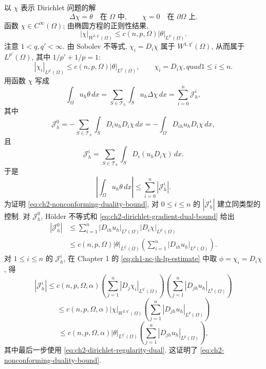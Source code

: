 \begin{Proof}
\hypertarget{chapter-02-page-145}{}
以 $\chi$ 表示 Dirichlet 问题的解
\[
\Delta\chi=\theta\quad\text{在 }\Omega\text{ 中},
\qquad\chi=0\quad\text{在 }\partial\Omega\text{ 上}.
\]
函数 $\chi\in C^\infty(\Omega)$; 由椭圆方程的正则性结果,
\begin{equation}
|\chi|_{W^{2,q'}(\Omega)}
\leq c(n,p,\Omega)|\theta|_{L^{q'}(\Omega)}.
\label{eq:ch2-dirichlet-regularity-dual}
\end{equation}
注意 $1<q,q'<\infty$. 由 Sobolev 不等式, $\chi_i=D_i\chi$ 属于 $W^{1,q'}(\Omega)$, 从而属于 $L^{p'}(\Omega)$, 其中 $1/p'+1/p=1$:
\begin{equation}
|\chi_i|_{L^{p'}(\Omega)}
\leq c(n,p,\Omega)|\theta|_{L^{q'}(\Omega)},
\qquad\chi_i=D_i\chi,quad1\leq i\leq n.
\label{eq:ch2-dirichlet-gradient-dual-bound}
\end{equation}
用函数 $\chi$ 写成
\[
\int_\Omega u_h\theta\,dx
=\sum_{S\in\mathcal T_h}\int_Su_h\Delta\chi\,dx
=\sum_{i=0}^{n}\mathcal J_h^i,
\]
其中
\[
\mathcal J_h^0=-\sum_{S\in\mathcal T_h}\int_SD_i u_hD_i\chi\,dx
=-\int_\Omega D_{ih}u_hD_i\chi\,dx,
\]
且
\[
\mathcal J_h^i=\sum_{S\in\mathcal T_h}\int_SD_i(u_hD_i\chi)\,dx.
\]
于是
\begin{equation}
\left|\int_\Omega u_h\theta\,dx\right|
\leq\sum_{i=0}^{n}|\mathcal J_h^i|.
\label{eq:ch2-nonconforming-duality-decomposition}
\end{equation}
为证明 \eqref{eq:ch2-nonconforming-duality-bound}, 对 $0\leq i\leq n$ 的 $|\mathcal J_h^i|$ 建立同类型的控制. 对 $\mathcal J_h^0$, Hölder 不等式和 \eqref{eq:ch2-dirichlet-gradient-dual-bound} 给出
\begin{equation}
\begin{aligned}
|\mathcal J_h^0|
&\leq\sum_{i=1}^{n}|D_{ih}u_h|_{L^p(\Omega)}|D_i\chi|_{L^{p'}(\Omega)}\\
&\leq c(n,p,\Omega)|\theta|_{L^{q'}(\Omega)}
\left(\sum_{i=1}^{n}|D_{ih}u_h|_{L^p(\Omega)}\right).
\end{aligned}
\label{eq:ch2-nonconforming-volume-term-bound}
\end{equation}
对 $1\leq i\leq n$ 的 $\mathcal J_h^i$, 在 Chapter 1 的 \eqref{eq:ch1-nc-jh-lp-estimate} 中取 $\phi=\chi_i=D_i\chi$, 得
\[
|\mathcal J_h^i|
\leq c(n,p,\Omega,\alpha)
\left(\sum_{j=1}^{n}|D_j\chi_i|_{L^{q'}(\Omega)}\right)
\left(\sum_{j=1}^{n}|D_{jh}u_h|_{L^p(\Omega)}\right)
\]
\[
\leq c(n,p,\Omega,\alpha)|\chi|_{W^{2,q'}(\Omega)}
\left(\sum_{j=1}^{n}|D_{jh}u_h|_{L^p(\Omega)}\right)
\]
\[
\leq c(n,p,\Omega,\alpha)|\theta|_{L^{q'}(\Omega)}
\left(\sum_{j=1}^{n}|D_{jh}u_h|_{L^p(\Omega)}\right),
\]
其中最后一步使用 \eqref{eq:ch2-dirichlet-regularity-dual}. 这证明了 \eqref{eq:ch2-nonconforming-duality-bound}.
\end{Proof}

